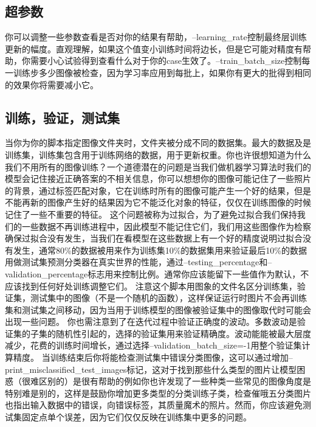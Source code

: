\subsection{超参数}
你可以调整一些参数查看是否对你的结果有帮助，--learning\_rate控制最终层训练更新的幅度。直观理解，如果这个值变小训练时间将边长，但是它可能对精度有帮助，你需要小心试验得到查看什么对于你的case生效了。--train\_batch\_size控制每一训练步多少图像被检查，因为学习率应用到每批上，如果你有更大的批得到相同的效果你将需要减小它。
\subsection{训练，验证，测试集}
当你为你的脚本指定图像文件夹时，文件夹被分成不同的数据集。最大的数据及是训练集，训练集包含用于训练网络的数据，用于更新权重。你也许很想知道为什么我们不用所有的图像训练？一个道德潜在的问题是当我们做机器学习算法时我们的模型会记住接近正确答案的不相关信息，你可以想想你的图像可能记住了一些照片的背景，通过标签匹配对象，它在训练时所有的图像可能产生一个好的结果，但是不能再新的图像产生好的结果因为它不能泛化对象的特征，仅仅在训练图像的时候记住了一些不重要的特征。
这个问题被称为过拟合，为了避免过拟合我们保持我们的一些数据不再训练进程中，因此模型不能记住它们，我们用这些图像作为检察确保过拟合没有发生，当我们在看模型在这些数据上有一个好的精度说明过拟合没有发生，通常80\%的数据被用来作为训练集10\%的数据集用来验证最后10\%的数据用做测试集预测分类器在真实世界的性能，通过--testing\_percentage和--validation\_percentage标志用来控制比例。通常你应该能留下一些值作为默认，不应该找到任何好处训练调整它们。
注意这个脚本用图象的文件名区分训练集，验证集，测试集中的图像（不是一个随机的函数），这样保证运行时图片不会再训练集和测试集之间移动，因为当用于训练模型的图像被验证集中的图像取代时可能会出现一些问题。
你也需注意到了在迭代过程中验证正确度的波动。多数波动是验证集的子集的随机性引起的，选择的验证集用来验证精确度。波动能能被最大层度减少，花费的训练时间增长，通过选择--validation\_batch\_size=-1用整个验证集计算精度。
当训练结束后你将能检查测试集中错误分类图像，这可以通过增加--print\_misclassified\_test\_images标记，这对于找到那些什么类型的图片让模型困惑（很难区别的）是很有帮助的例如你也许发现了一些种类一些常见的图像角度是特别难是别的，这样是鼓励你增加更多类型的分类训练子类，检查催哦五分类图片也指出输入数据中的错误，向错误标签，其质量魔术的照片。然而，你应该避免测试集固定点单个误差，因为它们仅仅反映在训练集中更多的问题。
